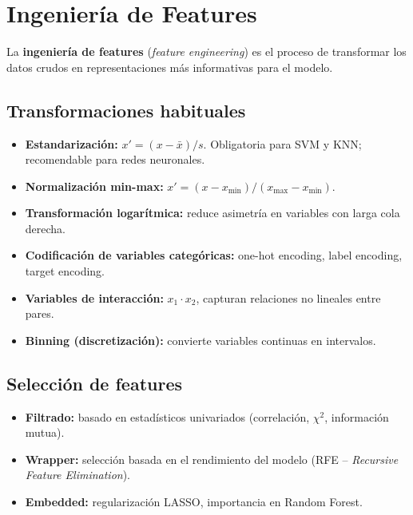\documentclass[12pt, a4paper]{article}
\theoremstyle{definition}
\theoremstyle{plain}
\theoremstyle{remark}
\begin{document}
\section{Ingeniería de Features}

La \textbf{ingeniería de features} (\textit{feature engineering}) es el proceso de transformar los datos crudos en representaciones más informativas para el modelo.

\subsection{Transformaciones habituales}

\begin{itemize}
  \item \textbf{Estandarización:} $x' = (x - \bar{x})/s$. Obligatoria para SVM y KNN; recomendable para redes neuronales.
  \item \textbf{Normalización min-max:} $x' = (x - x_{\min})/(x_{\max} - x_{\min})$.
  \item \textbf{Transformación logarítmica:} reduce asimetría en variables con larga cola derecha.
  \item \textbf{Codificación de variables categóricas:} one-hot encoding, label encoding, target encoding.
  \item \textbf{Variables de interacción:} $x_1 \cdot x_2$, capturan relaciones no lineales entre pares.
  \item \textbf{Binning (discretización):} convierte variables continuas en intervalos.
\end{itemize}

\subsection{Selección de features}

\begin{itemize}
  \item \textbf{Filtrado:} basado en estadísticos univariados (correlación, $\chi^2$, información mutua).
  \item \textbf{Wrapper:} selección basada en el rendimiento del modelo (RFE -- \textit{Recursive Feature Elimination}).
  \item \textbf{Embedded:} regularización LASSO, importancia en Random Forest.
\end{itemize}
\end{document}
